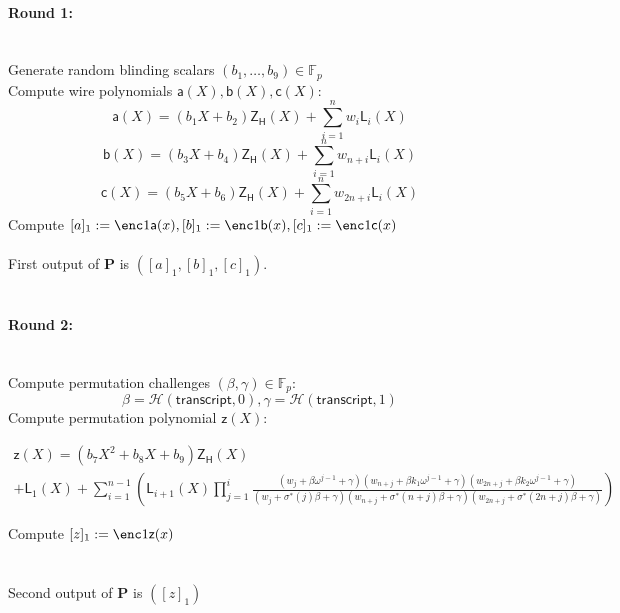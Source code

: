\documentclass[11pt]{article} %
\newcommand{\F}{\ensuremath{\mathbb F}\xspace}
\newcommand{\hash}{\ensuremath{\mathcal{H}}\xspace}
\newcommand{\prv}{\ensuremath{\mathsf{\mathbf{P}}}\xspace}
\newcommand{\ZeroH}{\ensuremath{Z_{H}} \xspace}
\newcommand{\lpoly}{\ensuremath{\mathsf{a}}\xspace}
\newcommand{\rpoly}{\ensuremath{\mathsf{b}}\xspace}
\newcommand{\opoly}{\ensuremath{\mathsf{c}}\xspace}
\newcommand{\idpermpoly}{\ensuremath{\mathsf{z}}\xspace}
\newcommand{\lagrangepoly}{\ensuremath{\mathsf{L}}\xspace}
\newcommand{\zeropoly}{\ensuremath{\mathsf{\ZeroH}}\xspace}
\newcommand{\snark}{\ensuremath{\mathsf{snark}}\xspace}
\newcommand{\Prove}{\mathcal{P}}
\newcommand{\Psnark}{\prv}%
\newcommand{\transcript}{\ensuremath{\mathsf{transcript}}\xspace}
\begin{document}
	\paragraph{\textbf{Round 1:}} \ \\
	Generate random blinding scalars $(b_1, \ldots, b_{9}) \in \F_p$ \\
	Compute wire polynomials $\lpoly(X), \rpoly(X), \opoly(X):$
	$$
	\lpoly(X) = (b_1X + b_2)\zeropoly(X) + \sum_{i=1}^nw_i\lagrangepoly_i(X)
	$$
	$$
	\rpoly(X) = (b_3X + b_4)\zeropoly(X) + \sum_{i=1}^nw_{n+i}\lagrangepoly_i(X)
	$$
	$$
	\opoly(X) = (b_5X + b_6)\zeropoly(X) + \sum_{i=1}^nw_{2n+i}\lagrangepoly_i(X)
	$$
	Compute $[a]_1 := \enc1{\lpoly(x)}, [b]_1 := \enc1{\rpoly(x)}, [c]_1 := \enc1{\opoly(x)}$
	\\ \\
	First output of $\Psnark$ is $([a]_1, [b]_1, [c]_1)$.
	\\ \\
	\noindent
	\paragraph{\textbf{Round 2:}} \ \\
	Compute permutation challenges $(\beta, \gamma) \in \F_p:$ \[\beta = \hash(\transcript,0), \gamma = \hash(\transcript, 1) \]
	Compute permutation polynomial $\idpermpoly(X):$
	\begin{adjustwidth}{-50mm}{-50mm}
	$$ 
	\begin{array}{c}
	\idpermpoly(X) = (b_7X^2 + b_8X + b_9)\zeropoly(X) \\
	+ \lagrangepoly_1(X) + \sum_{i=1}^{n-1} \left(
	\lagrangepoly_{i+1}(X) \prod_{j=1}^i\frac{(w_j + \beta \omega^{j-1} + \gamma)(w_{n+j} + \beta k_1 \omega^{j-1} + \gamma)(w_{2n + j} + \beta k_2 \omega^{j-1} + \gamma)}{(w_j + \sigma^*(j)\beta + \gamma)(w_{n+j} + \sigma^*(n+j)\beta + \gamma)(w_{2n+j} + \sigma^*(2n+j)\beta + \gamma)}
	\right)
	\end{array}
	$$
	\end{adjustwidth}
	Compute $[z]_1 := \enc1{\idpermpoly(x)}$ \\
	\\ \\
	Second output of $\Psnark$ is $([z]_1)$
	\\ \\
	\noindent
\end{document}

